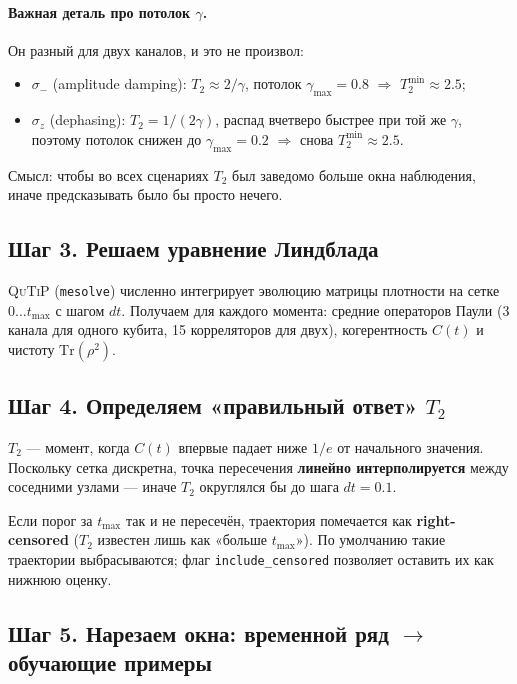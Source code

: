 \documentclass[12pt,a4paper]{article}
\newcommand{\code}[1]{\texttt{#1}}
\begin{document}
\paragraph{Важная деталь про потолок $\gamma$.} Он разный для двух каналов, и
это не произвол:

\begin{itemize}
  \item $\sigma_-$ (amplitude damping): $T_2\approx 2/\gamma$, потолок
        $\gamma_{\max}=0.8$ $\Rightarrow$ $T_2^{\min}\approx 2.5$;
  \item $\sigma_z$ (dephasing): $T_2=1/(2\gamma)$, распад вчетверо быстрее при
        той же $\gamma$, поэтому потолок снижен до $\gamma_{\max}=0.2$
        $\Rightarrow$ снова $T_2^{\min}\approx 2.5$.
\end{itemize}

Смысл: чтобы во всех сценариях $T_2$ был заведомо больше окна наблюдения, иначе
предсказывать было бы просто нечего.

\subsection{Шаг 3. Решаем уравнение Линдблада}

\textsc{QuTiP} (\code{mesolve}) численно интегрирует эволюцию матрицы плотности
на сетке $0\ldots t_{\max}$ с шагом $dt$. Получаем для каждого момента: средние
операторов Паули (3 канала для одного кубита, 15 корреляторов для двух),
когерентность $C(t)$ и чистоту $\mathrm{Tr}(\rho^2)$.

\subsection{Шаг 4. Определяем «правильный ответ» $T_2$}

$T_2$ — момент, когда $C(t)$ впервые падает ниже $1/e$ от начального значения.
Поскольку сетка дискретна, точка пересечения \textbf{линейно интерполируется}
между соседними узлами — иначе $T_2$ округлялся бы до шага $dt=0.1$.

Если порог за $t_{\max}$ так и не пересечён, траектория помечается как
\textbf{right-censored} ($T_2$ известен лишь как «больше $t_{\max}$»). По
умолчанию такие траектории выбрасываются; флаг \code{include\_censored}
позволяет оставить их как нижнюю оценку.

\subsection{Шаг 5. Нарезаем окна: временной ряд $\to$ обучающие примеры}
\end{document}
